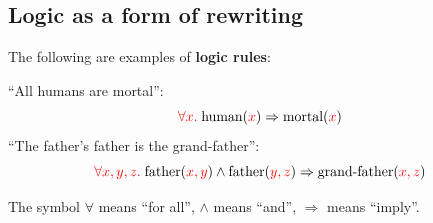 \subsection{Logic as a form of rewriting}

The following are examples of \textbf{logic rules}:

``All humans are mortal'':
\begin{equation}
{\color{red}\forall x.} \; \mbox{human}({\color{red}x}) \Rightarrow \mbox{mortal}({\color{red}x}) \\
\end{equation}
``The father's father is the grand-father'':
\begin{equation}
{\color{red}\forall x, y, z.} \; \mbox{father}({\color{red}x,y}) \wedge \mbox{father}({\color{red}y,z}) \Rightarrow \mbox{grand-father}({\color{red}x,z}) 
\end{equation}

The symbol $\forall$ means ``for all'', $\wedge$ means ``and'', $\Rightarrow$ means ``imply''.

